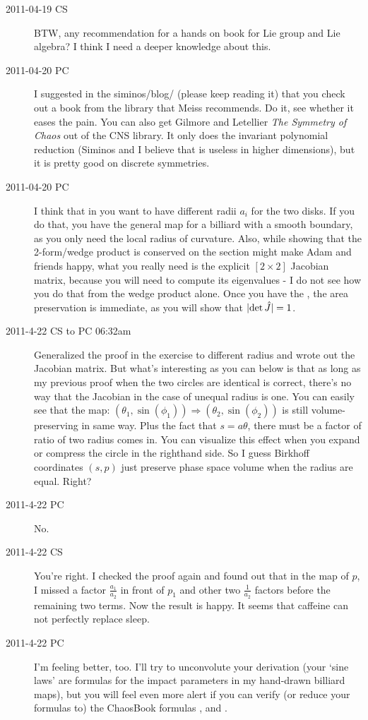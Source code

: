 \begin{description}
\item[2011-04-19 CS]
BTW, any recommendation for a hands on book for Lie group and Lie
algebra? I think I need a deeper knowledge about this.

\item[2011-04-20 PC] I suggested in the siminos/blog/ (please keep reading it)
that you check out a book from the library that Meiss recommends. Do it, see
whether it eases the pain. You can also get
Gilmore and Letellier
{\em The Symmetry of Chaos} out of the CNS library. It only does the
invariant polynomial reduction (Siminos and I believe that is useless in
higher dimensions), but it is pretty good on discrete symmetries.


\item[2011-04-20 PC]  I think that in  you want to
have different radii $a_i$ for the two disks. If you do that, you have
the general map for a billiard with a smooth boundary, as you only need the
local radius of curvature. Also, while showing that
the 2-form/wedge product is conserved on the \Poincare section might make
Adam and friends happy, what you really need is the explicit $[2\!\times\!2]$
Jacobian matrix, because you will need to compute its eigenvalues - I do not see
how you do that from the wedge product alone. Once you have the \jacobianM,
the area preservation is immediate, as you will show that $|\mbox{\rm det}\, \hat{J} |= 1$.

\item[2011-4-22 CS to PC 06:32am]  Generalized the proof in the exercise
to different radius and wrote out the Jacobian matrix. But what's
interesting as you can below is that as long as my previous proof when
the two circles are identical is correct, there's no way that the
Jacobian in the case of unequal radius is one. You can easily see that
the map: $(\theta_1, \sin(\phi_1))\Rightarrow(\theta_2, \sin(\phi_2))$ is
still volume-preserving in same way. Plus the fact that $s=a\theta$,
there must be a factor of ratio of two radius comes in. You can visualize
this effect when you expand or compress the circle in the righthand side.
So I guess Birkhoff coordinates $(s,p)$ just preserve phase space volume
when the radius are equal. Right?

\item[2011-4-22 PC] No.

\item[2011-4-22 CS]
You're right. I checked the proof again and found out that in the map of
$p$, I missed a factor $\frac{a_1}{a_2}$ in front of $p_1$ and other two
$\frac{1}{a_2}$ factors before the remaining two terms. Now the result is
happy. It seems that caffeine can not perfectly replace sleep.

\item[2011-4-22 PC]
I'm feeling better, too. I'll try to unconvolute your derivation (your
`sine laws' are formulas for the impact parameters in my hand-drawn
billiard maps), but you will feel even more alert if you can
verify (or reduce your formulas to) the ChaosBook formulas
,  and .


\end{description}
